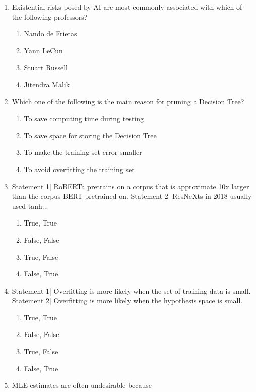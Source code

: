 \documentclass[12pt]{article}
\begin{document}
\begin{enumerate}[label=\arabic*.]
\begin{enumerate}[label=(\alph*)]
    \item The assumed variance of the Gaussian noise
    \item The use of a constant-term unit input
\end{enumerate}
\item Existential risks posed by AI are most commonly associated with which of the following professors?
\begin{enumerate}[label=(\alph*)]
    \item Nando de Frietas
    \item Yann LeCun
    \item Stuart Russell
    \item Jitendra Malik
\end{enumerate}
\item Which one of the following is the main reason for pruning a Decision Tree?
\begin{enumerate}[label=(\alph*)]
    \item To save computing time during testing
    \item To save space for storing the Decision Tree
    \item To make the training set error smaller
    \item To avoid overfitting the training set
\end{enumerate}
\item Statement 1| RoBERTa pretrains on a corpus that is approximate 10x larger than the corpus BERT pretrained on. Statement 2| ResNeXts in 2018 usually used tanh...
\begin{enumerate}[label=(\alph*)]
    \item True, True
    \item False, False
    \item True, False
    \item False, True
\end{enumerate}
\item Statement 1| Overfitting is more likely when the set of training data is small. Statement 2| Overfitting is more likely when the hypothesis space is small.
\begin{enumerate}[label=(\alph*)]
    \item True, True
    \item False, False
    \item True, False
    \item False, True
\end{enumerate}
\item MLE estimates are often undesirable because

\end{enumerate}
\end{document}
